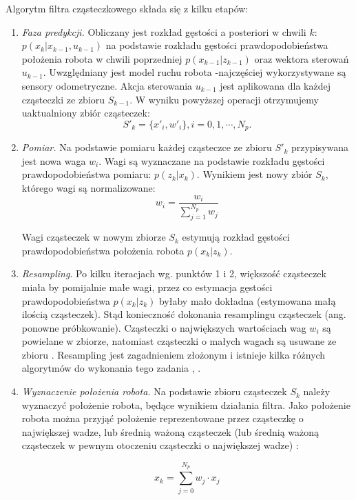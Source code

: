 Algorytm filtra cząsteczkowego składa się z kilku etapów: 
\begin{enumerate}
 \item \textit{Faza predykcji.} Obliczany jest rozkład gęstości a posteriori w chwili $k$:  $p(x_{k} | x_{k-1}, u_{k-1})$ na podstawie rozkładu gęstości prawdopodobieństwa położenia robota w chwili poprzedniej $p(x_{k-1} | z_{k-1})$ oraz wektora sterowań $u_{k-1}$. Uwzględniany jest model ruchu robota -najczęściej wykorzystywane są sensory odometryczne. Akcja sterowania $u_{k-1} $ jest aplikowana dla każdej cząsteczki ze zbioru $S_{k-1}$. W wyniku powyższej operacji otrzymujemy uaktualniony zbiór cząsteczek:
 \begin{equation}
 \label{eq:pf_sk2}
 S'_{k} = \{ x'_i, w'_i \}, i = 0, 1, \cdots, N_p.
\end{equation}

\item \textit{Pomiar.} Na podstawie pomiaru każdej cząsteczce ze zbioru $S'_{k}$ przypisywana jest nowa waga $w_i$. Wagi są wyznaczane na podstawie rozkładu gęstości prawdopodobieństwa pomiaru: $p(z_{k} | x_{k} )$. Wynikiem jest nowy zbiór $S_{k}$, którego wagi są normalizowane:
\begin{equation}
 w_i = \frac{w_i}{\sum_{j=1}^{N_p} w_j}
\end{equation}

Wagi cząsteczek w nowym zbiorze $S_{k}$ estymują rozkład gęstości prawdopodobieństwa położenia robota $p(x_{k} | z_{k})$.

\item \textit{Resampling}. Po kilku iteracjach wg. punktów 1 i 2, większość cząsteczek miała by pomijalnie małe wagi, przez co estymacja gęstości prawdopodobieństwa $p(x_{k} | z_{k})$ byłaby mało dokładna (estymowana małą ilością cząsteczek). Stąd konieczność dokonania resamplingu cząsteczek (ang. ponowne próbkowanie). Cząsteczki o największych wartościach wag $w_i$ są powielane w zbiorze, natomiast cząsteczki o małych wagach są usuwane ze zbioru \cite{preskrypt}. Resampling jest zagadnieniem złożonym i istnieje kilka różnych algorytmów do wykonania tego zadania \cite{trilat_particle}, \cite{particle_pl}.

\item \textit{Wyznaczenie położenia robota.} Na podstawie zbioru cząsteczek $S_{k}$ należy wyznaczyć położenie robota, będące wynikiem działania filtra. Jako położenie robota można przyjąć położenie reprezentowane przez cząsteczkę o największej wadze, lub średnią ważoną cząsteczek (lub średnią ważoną cząsteczek w pewnym otoczeniu cząsteczki o największej wadze) \cite{preskrypt}:

\begin{equation}
 x_{k} = \sum_{j=0}^{N_p} w_j \cdot x_j
\end{equation}

\end{enumerate}

